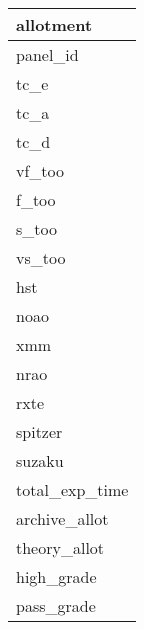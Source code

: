 \documentclass{article}
\begin{document}

\begin{tabular}{|l|} \hline
\textbf{allotment} \\ \hline
panel\_id \\ \hline
tc\_e \\ \hline
tc\_a \\ \hline
tc\_d \\ \hline
vf\_too \\ \hline
f\_too \\ \hline
s\_too \\ \hline
vs\_too \\ \hline
hst \\ \hline
noao \\ \hline
xmm \\ \hline
nrao \\ \hline
rxte \\ \hline
spitzer \\ \hline
suzaku \\ \hline
total\_exp\_time \\ \hline
archive\_allot \\ \hline
theory\_allot \\ \hline
high\_grade \\ \hline
pass\_grade \\ \hline
\end{tabular}
\end{document}
